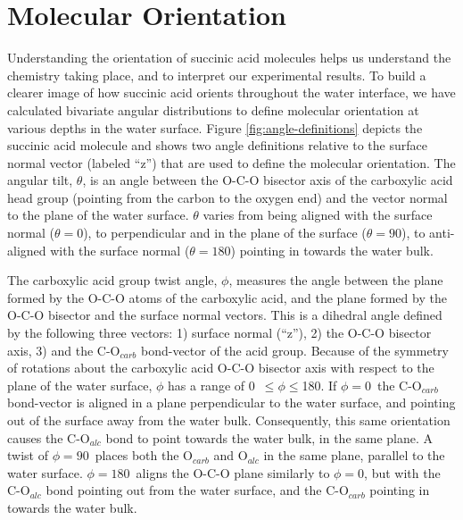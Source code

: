 \section {Molecular Orientation}

Understanding the orientation of succinic acid molecules helps us understand the chemistry taking place, and to interpret our experimental results. To build a clearer image of how succinic acid orients throughout the water interface, we have calculated bivariate angular distributions to define molecular orientation at various depths in the water surface. Figure \ref{fig:angle-definitions} depicts the succinic acid molecule and shows two angle definitions relative to the surface normal vector (labeled ``z'') that are used to define the molecular orientation. The angular tilt, $\theta$, is an angle between the O-C-O bisector axis of the carboxylic acid head group (pointing from the carbon to the oxygen end) and the vector normal to the plane of the water surface. $\theta$ varies from being aligned with the surface normal ($\theta=0$\textdegree), to perpendicular and in the plane of the surface ($\theta=90$\textdegree), to anti-aligned with the surface normal ($\theta=180$\textdegree) pointing in towards the water bulk. 

The carboxylic acid group twist angle, $\phi$, measures the angle between the plane formed by the O-C-O atoms of the carboxylic acid, and the plane formed by the O-C-O bisector and the surface normal vectors. This is a dihedral angle defined by the following three vectors: 1) surface normal (``z''), 2) the O-C-O bisector axis, 3) and the C-O$_{carb}$ bond-vector of the acid group. Because of the symmetry of rotations about the carboxylic acid O-C-O bisector axis with respect to the plane of the water surface, $\phi$ has a range of 0\textdegree~$ \le \phi \le $180\textdegree. If $\phi=0$\textdegree~the C-O$_{carb}$ bond-vector is aligned in a plane perpendicular to the water surface, and pointing out of the surface away from the water bulk. Consequently, this same orientation causes the C-O$_{alc}$ bond to point towards the water bulk, in the same plane. A twist of $\phi=90$\textdegree~places both the O$_{carb}$ and O$_{alc}$ in the same plane, parallel to the water surface. $\phi=180$\textdegree~aligns the O-C-O plane similarly to $\phi=0$\textdegree, but with the C-O$_{alc}$ bond pointing out from the water surface, and the C-O$_{carb}$ pointing in towards the water bulk. 


